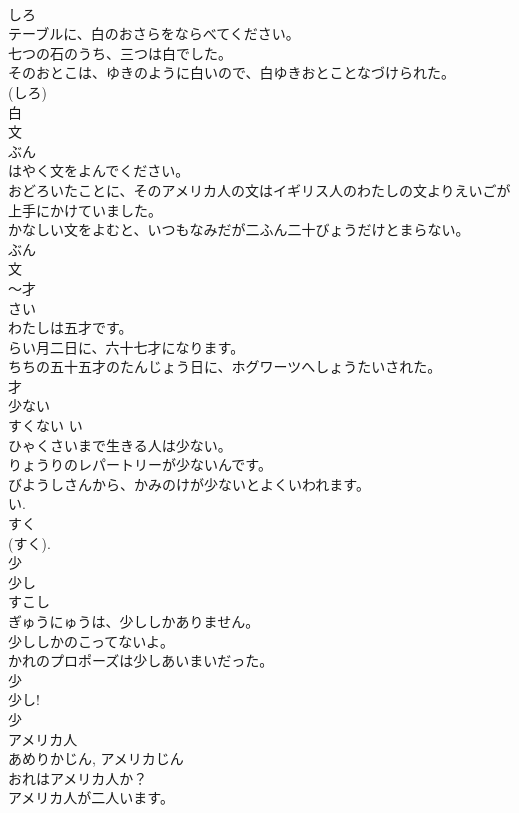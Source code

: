 \documentclass[8pt]{extreport}
\begin{document}
\begin{CJK}{UTF8}{min}
\\	しろ	
\\	テーブルに、白のおさらをならべてください。	
\\	七つの石のうち、三つは白でした。	
\\	そのおとこは、ゆきのように白いので、白ゆきおとことなづけられた。	
\\	(しろ) 
\\	白	
\\	文	
\\	ぶん	
\\	はやく文をよんでください。	
\\	おどろいたことに、そのアメリカ人の文はイギリス人のわたしの文よりえいごが上手にかけていました。	
\\	かなしい文をよむと、いつもなみだが二ふん二十びょうだけとまらない。	
\\	ぶん 
\\	文	
\\	〜才	
\\	さい	
\\	わたしは五才です。	
\\	らい月二日に、六十七才になります。	
\\	ちちの五十五才のたんじょう日に、ホグワーツへしょうたいされた。	
\\	才	
\\	少ない	
\\	すくない	い 
\\	ひゃくさいまで生きる人は少ない。	
\\	りょうりのレパートリーが少ないんです。	
\\	びようしさんから、かみのけが少ないとよくいわれます。	
\\	い. 
\\	すく 
\\	(すく). 
\\	少	
\\	少し	
\\	すこし	
\\	ぎゅうにゅうは、少ししかありません。	
\\	少ししかのこってないよ。	
\\	かれのプロポーズは少しあいまいだった。	
\\	少 
\\	少し! 
\\	少	
\\	アメリカ人	
\\	あめりかじん, アメリカじん	
\\	おれはアメリカ人か？	
\\	アメリカ人が二人います。	

\end{CJK}
\end{document}
